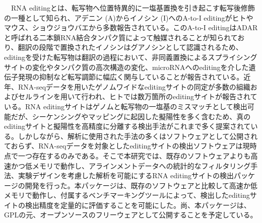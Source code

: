 \begin{jabstract}
　RNA editingとは、転写物へ位置特異的に一塩基置換を引き起こす転写後修飾の一種として知られ、アデニン (A)からイノシン (I)へのA-to-I editingがヒトやマウス、ショウジョウバエから多数報告されている。このA-to-I editingはADARと呼ばれる二本鎖RNA結合タンパク質によって触媒されることが知られており、翻訳の段階で置換されたイノシンはグアノシンとして認識されるため、editingを受けた転写物は翻訳の過程において、非同義置換によるスプライシングサイトの変化やタンパク質の高次構造の変化、microRNAへのeditingを介した遺伝子発現の抑制など転写調節に幅広く関与していることが報告されている。近年、RNA-seqデータを用いたゲノムワイドなeditingサイトの同定が多数の組織およびセルラインを用いて行われ、ヒトでは数万箇所のeditingサイトが報告されている。RNA editingサイトはゲノムと転写物の一塩基のミスマッチとして検出可能だが、シーケンシングやマッピングに起因した擬陽性を多く含むため、真のeditingサイトと擬陽性を高精度に分離する検出手法がこれまで多く提案されている。しかしながら、解析に使用された手法の多くはソフトウェアとして公開されておらず、RNA-seqデータを対象としたeditingサイトの検出ソフトウェアは現時点で一つ存在するのみである。そこで本研究では、既存のソフトウェアよりも高速かつ低メモリで動作し、アラインメントデータへの統計的なフィルタリング手法、実験デザインを考慮した解析を可能にするRNA editingサイトの検出パッケージの開発を行った。本パッケージは、既存のソフトウェアと比較して高速か低メモリで動作し、付属するベンチマーキングツールによって、検出したeditingサイトの検出精度を定量的に評価することを可能にした。尚、本パッケージは、GPLの元、オープンソースのフリーウェアとして公開することを予定している。
\end{jabstract}

